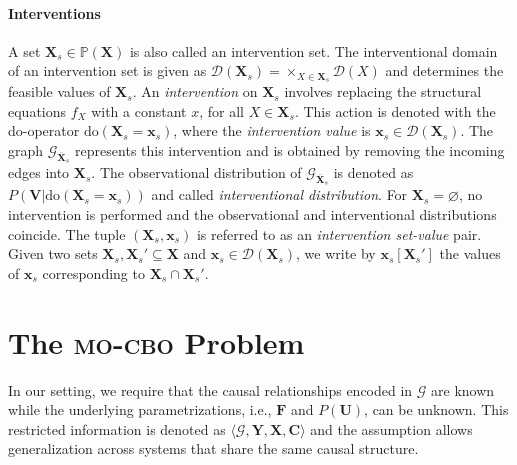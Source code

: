 \paragraph{Interventions} A set $\mathbf{X}_s \in \mathbb{P}(\mathbf{X})$ is also called an intervention set. The interventional domain of an intervention set is given as $\mathcal{D}(\mathbf{X}_s)= \times_{X \in \mathbf{X}_s} \mathcal{D}(X)$ and determines the feasible values of $\mathbf{X}_s$. An \textit{intervention} on $\mathbf{X}_s$ involves replacing the structural equations $f_{X}$ with a constant $x$, for all $X \in \mathbf{X}_s$. This action is denoted with the do-operator $\text{do}(\mathbf{X}_s = \mathbf{x}_s)$, where the \textit{intervention value} is $\mathbf{x}_s \in \mathcal{D}(\mathbf{X}_s)$. 
The graph $\mathcal{G}_{\overline{\mathbf{X}}_s}$ represents this intervention and is obtained by removing the incoming edges into $\mathbf{X}_s$. 
The observational distribution of $\mathcal{G}_{\overline{\mathbf{X}}_s}$ is denoted as $P(\mathbf{V} | \text{do}(\mathbf{X}_s=\mathbf{x}_s))$
and called \textit{interventional distribution}. 
For $\mathbf{X}_s =\varnothing$, no intervention is performed and the observational and interventional distributions coincide. The tuple $(\mathbf{X}_s,\mathbf{x}_s)$ is referred to as an \textit{intervention set-value} pair. Given two sets $\mathbf{X}_s, \mathbf{X}_s' \subseteq \mathbf{X}$ and $\mathbf{x}_s \in \mathcal{D}(\mathbf{X}_s)$, we write by $\mathbf{x}_s[\mathbf{X}_s']$ the values of $\mathbf{x}_s$ corresponding to $\mathbf{X}_s \cap \mathbf{X}_s'$. 


\section{The \textsc{mo-cbo} 
Problem}\label{sec:mo_cbo}

In our setting, we require that the causal relationships encoded in $\mathcal{G}$ are known while the underlying parametrizations, i.e., $\mathbf{F}$ and $P(\mathbf{U})$, can be unknown. This restricted information is denoted as $\langle \mathcal{G},\mathbf{Y}, \mathbf{X}, \mathbf{C}\rangle$ and the assumption allows generalization across systems that share the same causal structure. 

